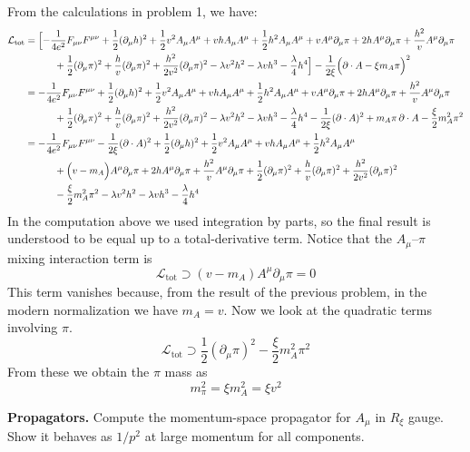\begin{solution}[23.3]
	From the calculations in problem 1, we have:
$$
\begin{aligned}
	\mathcal{L}_{\text{tot}}
	&=\Bigl[-\frac{1}{4e^2}F_{\mu\nu}F^{\mu\nu}+\frac{1}{2}(\partial_\mu h)^2+\frac{1}{2}v^2A_\mu A^\mu+vhA_\mu A^\mu+\frac{1}{2}h^2A_\mu A^\mu+vA^\mu\partial_\mu\pi+2hA^\mu\partial_\mu\pi+\frac{h^2}{v}A^\mu\partial_\mu\pi \\
	&\qquad\quad+\frac{1}{2}(\partial_\mu\pi)^2+\frac{h}{v}(\partial_\mu\pi)^2+\frac{h^2}{2v^2}(\partial_\mu\pi)^2-\lambda v^2h^2-\lambda vh^3-\frac{\lambda}{4}h^4\Bigr]
	-\frac{1}{2\xi}\Bigl(\partial\cdot A-\xi m_A\pi\Bigr)^2 \\
	&=-\frac{1}{4e^2}F_{\mu\nu}F^{\mu\nu}+\frac{1}{2}(\partial_\mu h)^2+\frac{1}{2}v^2A_\mu A^\mu+vhA_\mu A^\mu+\frac{1}{2}h^2A_\mu A^\mu+vA^\mu\partial_\mu\pi+2hA^\mu\partial_\mu\pi+\frac{h^2}{v}A^\mu\partial_\mu\pi \\
	&\qquad\quad+\frac{1}{2}(\partial_\mu\pi)^2+\frac{h}{v}(\partial_\mu\pi)^2+\frac{h^2}{2v^2}(\partial_\mu\pi)^2-\lambda v^2h^2-\lambda vh^3-\frac{\lambda}{4}h^4
	-\frac{1}{2\xi}(\partial\cdot A)^2+m_A\pi\,\partial\cdot A-\frac{\xi}{2}m_A^2\pi^2 \\
	&=-\frac{1}{4e^2}F_{\mu\nu}F^{\mu\nu}-\frac{1}{2\xi}(\partial\cdot A)^2+\frac{1}{2}(\partial_\mu h)^2+\frac{1}{2}v^2A_\mu A^\mu+vhA_\mu A^\mu+\frac{1}{2}h^2A_\mu A^\mu \\
	&\qquad\quad+\Bigl(v-m_A\Bigr)A^\mu\partial_\mu\pi+2hA^\mu\partial_\mu\pi+\frac{h^2}{v}A^\mu\partial_\mu\pi
	+\frac{1}{2}(\partial_\mu\pi)^2+\frac{h}{v}(\partial_\mu\pi)^2+\frac{h^2}{2v^2}(\partial_\mu\pi)^2 \\
	&\qquad\quad-\frac{\xi}{2}m_A^2\pi^2-\lambda v^2h^2-\lambda vh^3-\frac{\lambda}{4}h^4
\end{aligned}
$$
In the computation above we used integration by parts, so the final result is understood to be equal up to a total-derivative term. 
Notice that the $A_\mu$--$\pi$ mixing interaction term is
\[
\boxed{
\mathcal{L}_{\text{tot}}\supset \left(v-m_{A}\right)A^{\mu}\partial_{\mu}\pi=0
}
\]
This term vanishes because, from the result of the previous problem, in the modern normalization we have $m_A=v$. Now we look at the quadratic terms involving $\pi$. 
\[
\mathcal{L}_{\text{tot}}\supset \frac{1}{2}(\partial_\mu\pi)^2-\frac{\xi}{2}m_A^2\pi^2
\]
From these we obtain the $\pi$ mass as
\[
\boxed{
m_\pi^2=\xi m_A^2=\xi v^2
}
\]
\end{solution}
\begin{problem}
    \textbf{Propagators.} Compute the momentum-space propagator for \(A_\mu\) in \(R_\xi\) gauge. Show it behaves as \(1/p^2\) at large momentum for all components.
\end{problem}
